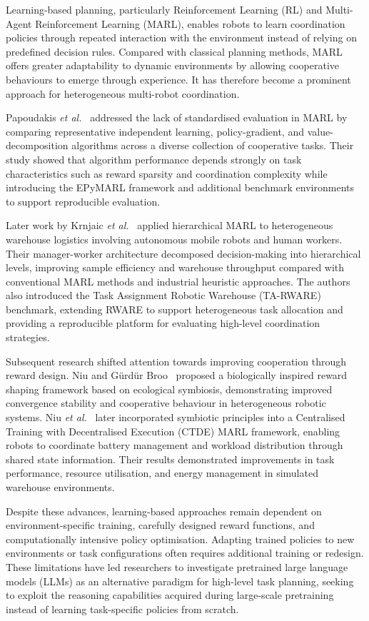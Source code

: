 Learning-based planning, particularly Reinforcement Learning (RL) and Multi-Agent Reinforcement Learning (MARL), enables robots to learn coordination policies through repeated interaction with the environment instead of relying on predefined decision rules. Compared with classical planning methods, MARL offers greater adaptability to dynamic environments by allowing cooperative behaviours to emerge through experience. It has therefore become a prominent approach for heterogeneous multi-robot coordination.

Papoudakis \textit{et al.}~\cite{papoudakis2021benchmarking} addressed the lack of standardised evaluation in MARL by comparing representative independent learning, policy-gradient, and value-decomposition algorithms across a diverse collection of cooperative tasks. Their study showed that algorithm performance depends strongly on task characteristics such as reward sparsity and coordination complexity while introducing the EPyMARL framework and additional benchmark environments to support reproducible evaluation.

Later work by Krnjaic \textit{et al.}~\cite{krnjaic2024warehouse} applied hierarchical MARL to heterogeneous warehouse logistics involving autonomous mobile robots and human workers. Their manager-worker architecture decomposed decision-making into hierarchical levels, improving sample efficiency and warehouse throughput compared with conventional MARL methods and industrial heuristic approaches. The authors also introduced the Task Assignment Robotic Warehouse (TA-RWARE) benchmark, extending RWARE to support heterogeneous task allocation and providing a reproducible platform for evaluating high-level coordination strategies.

Subsequent research shifted attention towards improving cooperation through reward design. Niu and Gürdür Broo~\cite{niu2025rewardshaping} proposed a biologically inspired reward shaping framework based on ecological symbiosis, demonstrating improved convergence stability and cooperative behaviour in heterogeneous robotic systems. Niu \textit{et al.}~\cite{niu2025symbiosis} later incorporated symbiotic principles into a Centralised Training with Decentralised Execution (CTDE) MARL framework, enabling robots to coordinate battery management and workload distribution through shared state information. Their results demonstrated improvements in task performance, resource utilisation, and energy management in simulated warehouse environments.

Despite these advances, learning-based approaches remain dependent on environment-specific training, carefully designed reward functions, and computationally intensive policy optimisation. Adapting trained policies to new environments or task configurations often requires additional training or redesign. These limitations have led researchers to investigate pretrained large language models (LLMs) as an alternative paradigm for high-level task planning, seeking to exploit the reasoning capabilities acquired during large-scale pretraining instead of learning task-specific policies from scratch.


